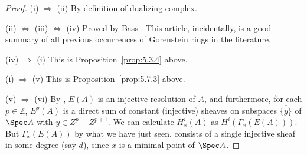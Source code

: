 \begin{proof}
(i) $\Longrightarrow$ (ii) By definition of dualizing complex.

\noindent (ii) $\Longleftrightarrow$ (iii) $\Longleftrightarrow$ (iv) Proved by Bass \cite[\nopp Thm.~4.1]{2}. This article, incidentally, is a good summary of all previous occurrences of Gorenstein rings in the literature.

\noindent (iv) $\Longrightarrow$ (i) This is Proposition~\ref{prop:5.3.4} above.

\noindent (i) $\Longrightarrow$ (v) This is Proposition~\ref{prop:5.7.3} above.

\noindent (v) $\Longrightarrow$ (vi) By , $E(A)$ is an injective resolution of $A$, and furthermore, for each $p\in\mathbb{Z}$, $E^{p}(A)$ is a direct sum of constant (injective) sheaves on subspaces $\overline{\{y\}}$ of $\Spec A$ with $y\in Z^{p}-Z^{p+1}$. We can calculate $H_{x}^{i}(A)$ as $H^{i}(\Gamma_{x}(E(A)))$. But $\Gamma_{x}(E(A))$ by what we have just seen, consists of a single injective sheaf in some degree (say $d$), since $x$ is a minimal point of $\Spec A$.


\end{proof}
